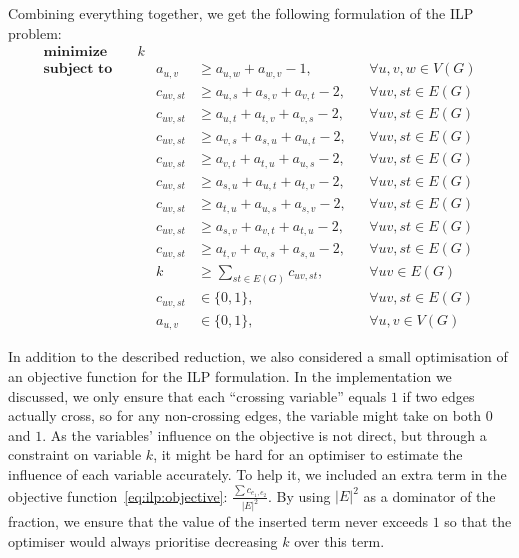 Combining everything together, we get the following formulation of the ILP problem:
\begin{align}
    \textbf{minimize}\quad&k  \label{eq:ilp:objective}\\
    \textbf{subject to}\quad
    &&a_{u, v} &\geqslant a_{u, w} + a_{w, v} - 1,&&\forall u, v, w \in V(G)  \label{eq:ilp:con:transitivity}\\
    &&c_{uv, st} &\geqslant a_{u,s} + a_{s,v} + a_{v,t} - 2,&&\forall uv, st \in E(G)  \label{eq:ilp:con:cross-example}\\
    &&c_{uv, st} &\geqslant a_{u,t} + a_{t,v} + a_{v,s} - 2,&&\forall uv, st \in E(G) \label{eq:ilp:con:cross-begin}\\
    &&c_{uv, st} &\geqslant a_{v,s} + a_{s,u} + a_{u,t} - 2,&&\forall uv, st \in E(G)\\
    &&c_{uv, st} &\geqslant a_{v,t} + a_{t,u} + a_{u,s} - 2,&&\forall uv, st \in E(G)\\
    &&c_{uv, st} &\geqslant a_{s,u} + a_{u,t} + a_{t,v} - 2,&&\forall uv, st \in E(G)\\
    &&c_{uv, st} &\geqslant a_{t,u} + a_{u,s} + a_{s,v} - 2,&&\forall uv, st \in E(G)\\
    &&c_{uv, st} &\geqslant a_{s,v} + a_{v,t} + a_{t,u} - 2,&&\forall uv, st \in E(G)\\
    &&c_{uv, st} &\geqslant a_{t,v} + a_{v,s} + a_{s,u} - 2,&&\forall uv, st \in E(G)  \label{eq:ilp:con:cross-end}\\
    &&k &\geqslant \sum_{st \in E(G)} c_{uv, st},&&\forall uv \in E(G)  \label{eq:ilp:con:crossing-number}\\
    &&c_{uv, st} &\in \{0, 1\},&&\forall uv, st \in E(G)  \label{eq:ilp:con:cross-var}\\
    &&a_{u, v} &\in \{0, 1\},&&\forall u, v \in V(G)  \label{eq:ilp:con:order-var}
\end{align}

In addition to the described reduction, we also considered a small optimisation of an objective function for the ILP formulation. In the implementation we discussed, we only ensure that each ``crossing variable'' equals \(1\) if two edges actually cross, so for any non-crossing edges, the variable might take on both \(0\) and \(1\). As the variables' influence on the objective is not direct, but through a constraint on variable \(k\), it might be hard for an optimiser to estimate the influence of each variable accurately. To help it, we included an extra term in the objective function~\eqref{eq:ilp:objective}: \(\frac{\sum c_{e_1, e_2}}{|E|^2}\). By using \(|E|^2\) as a dominator of the fraction, we ensure that the value of the inserted term never exceeds \(1\) so that the optimiser would always prioritise decreasing \(k\) over this term.


